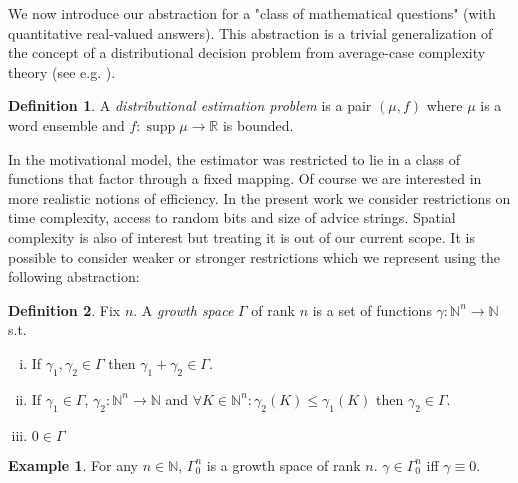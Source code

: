 \documentclass{article}
\numberwithin{equation}{section}
\theoremstyle{definition}
\newtheorem{definition}{Definition}[section]
\newtheorem{example}{Example}[section]
\theoremstyle{plain}
\DeclareMathOperator{\Supp}{supp}
\newcommand{\Nats}{\mathbb{N}}
\newcommand{\Reals}{\mathbb{R}}
\begin{document}
We now introduce our abstraction for a "class of mathematical questions" (with quantitative real-valued answers). This abstraction is a trivial generalization of the concept of a distributional decision problem from average-case complexity theory (see e.g. \cite{Bogdanov_2006}).

\begin{definition}

A \emph{distributional estimation problem} is a pair $(\mu,f)$ where $\mu$ is a word ensemble and $f: \Supp \mu \rightarrow \Reals$ is bounded.

\end{definition}

In the motivational model, the estimator was restricted to lie in a class of functions that factor through a fixed mapping. Of course we are interested in more realistic notions of efficiency. In the present work we consider restrictions on time complexity, access to random bits and size of advice strings. Spatial complexity is also of interest but treating it is out of our current scope. It is possible to consider weaker or stronger restrictions which we represent using the following abstraction:

\begin{definition}

Fix $n$. A \emph{growth space} $\Gamma$ of rank $n$ is a set of functions ${\gamma: \Nats^n \rightarrow \Nats}$ s.t.

\begin{enumerate}[(i)]

\item If $\gamma_1, \gamma_2 \in \Gamma$ then $\gamma_1 + \gamma_2 \in \Gamma$.

\item If $\gamma_1 \in \Gamma$, $\gamma_2: \Nats^n \rightarrow \Nats$ and $\forall K \in \Nats^n: \gamma_2(K) \leq \gamma_1(K)$ then $\gamma_2 \in \Gamma$.

\item $0 \in \Gamma$

\end{enumerate}

\begin{example}

For any $n \in \Nats$, $\Gamma_0^n$ is a growth space of rank $n$. $\gamma \in \Gamma_0^n$ iff $\gamma \equiv 0$.

\end{example}

\end{definition}
\end{document}
